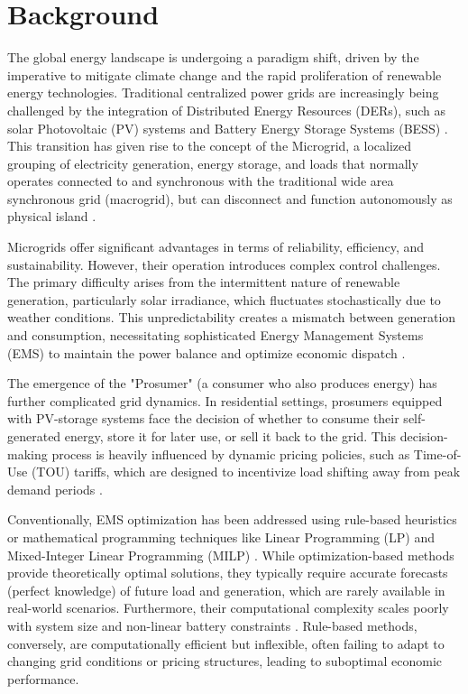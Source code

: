 \section{Background}

The global energy landscape is undergoing a paradigm shift, driven by the imperative to mitigate climate change and the rapid proliferation of renewable energy technologies. Traditional centralized power grids are increasingly being challenged by the integration of Distributed Energy Resources (DERs), such as solar Photovoltaic (PV) systems and Battery Energy Storage Systems (BESS) \cite{ref_iea_2023}. This transition has given rise to the concept of the Microgrid, a localized grouping of electricity generation, energy storage, and loads that normally operates connected to and synchronous with the traditional wide area synchronous grid (macrogrid), but can disconnect and function autonomously as physical island \cite{Zia2018}.

Microgrids offer significant advantages in terms of reliability, efficiency, and sustainability. However, their operation introduces complex control challenges. The primary difficulty arises from the intermittent nature of renewable generation, particularly solar irradiance, which fluctuates stochastically due to weather conditions. This unpredictability creates a mismatch between generation and consumption, necessitating sophisticated Energy Management Systems (EMS) to maintain the power balance and optimize economic dispatch \cite{Olivares2014}.

The emergence of the "Prosumer" (a consumer who also produces energy) has further complicated grid dynamics. In residential settings, prosumers equipped with PV-storage systems face the decision of whether to consume their self-generated energy, store it for later use, or sell it back to the grid. This decision-making process is heavily influenced by dynamic pricing policies, such as Time-of-Use (TOU) tariffs, which are designed to incentivize load shifting away from peak demand periods \cite{Newsham2011}.

Conventionally, EMS optimization has been addressed using rule-based heuristics or mathematical programming techniques like Linear Programming (LP) and Mixed-Integer Linear Programming (MILP) \cite{SARDA2022280}. While optimization-based methods provide theoretically optimal solutions, they typically require accurate forecasts (perfect knowledge) of future load and generation, which are rarely available in real-world scenarios. Furthermore, their computational complexity scales poorly with system size and non-linear battery constraints \cite{Huang2021}. Rule-based methods, conversely, are computationally efficient but inflexible, often failing to adapt to changing grid conditions or pricing structures, leading to suboptimal economic performance.

